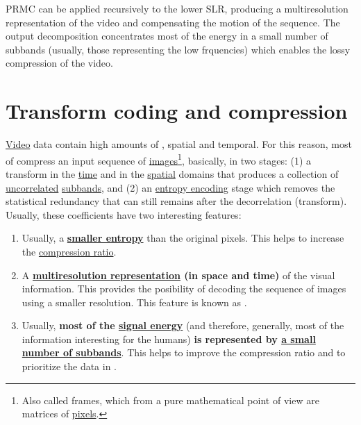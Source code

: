 PRMC can be applied recursively to the lower SLR, producing a
multiresolution representation of the video and compensating the
motion of the sequence. The output decomposition concentrates most of
the energy in a small number of subbands (usually, those representing
the low frquencies) which enables the lossy compression of the video.


\section{Transform coding and compression}

\href{https://en.wikipedia.org/wiki/Video}{Video} data contain high
amounts of , spatial and temporal. For
this reason, most of 
compress an input sequence of
\href{https://en.wikipedia.org/wiki/Digital_image}{images}\footnote{Also
  called frames, which from a pure mathematical point of view are
  matrices of \href{https://en.wikipedia.org/wiki/Pixel}{pixels}.},
basically, in two stages: (1) a transform in the
\href{https://en.wikipedia.org/wiki/Time_domain}{time} and in the
\href{https://www.quora.com/What-is-spatial-domain-in-image-processing}{spatial}
domains that produces a collection of
\href{https://en.wikipedia.org/wiki/Decorrelation}{uncorrelated}
\href{https://en.wikipedia.org/wiki/Discrete_wavelet_transform}{subbands},
and (2) an
\href{https://en.wikipedia.org/wiki/Entropy_encoding}{entropy
  encoding} stage which removes the statistical redundancy that can
still remains after the decorrelation (transform). Usually, these
coefficients have two interesting features:
\begin{enumerate}
\item Usually, a \textbf{
  \href{https://vicente-gonzalez-ruiz.github.io/symbol_compression/}{smaller
  entropy}} than the original pixels. This helps to increase
  the \href{https://en.wikipedia.org/wiki/Data_compression_ratio}{compression
    ratio}.
\item A
  \textbf{\href{https://en.wikipedia.org/wiki/Image_resolution}{multiresolution
      representation} (in space and time)} of the visual
  information. This provides the posibility of decoding the sequence
  of images using a smaller resolution. This feature is known as
  .
\item Usually, \textbf{most of the
  \href{https://en.wikipedia.org/wiki/Energy_(signal_processing)}{signal
    energy}} (and therefore, generally, most of the information
  interesting for the humans) \textbf{is represented by
    \href{https://vicente-gonzalez-ruiz.github.io/image_transformations_for_coding}{a
      small number of subbands}}. This helps to improve the
  compression ratio and to prioritize the data in
  .
\end{enumerate}

